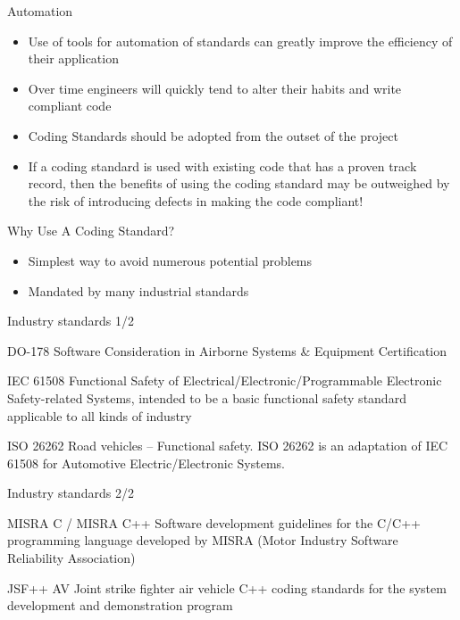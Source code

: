 \documentclass{beamer}
\begin{document}
\begin{frame}{Automation}
\begin{itemize}
  \item Use of tools for automation of standards can greatly improve the
  efficiency of their application
  \item Over time engineers will quickly tend to alter their habits and write
  compliant code
  \item Coding Standards should be adopted from the outset of the project
  \item If a coding standard is used with existing code that has a proven track
  record, then the benefits of using the coding standard may be outweighed by
  the risk of introducing defects in making the code compliant!
\end{itemize}
\end{frame}

\begin{frame}{Why Use A Coding Standard?}
\begin{itemize}
  \item Simplest way to avoid numerous potential problems
  \item Mandated by many industrial standards
\end{itemize}
\end{frame}

\begin{frame}{Industry standards 1/2}
\begin{block}{DO-178}
Software Consideration in Airborne Systems \& Equipment Certification
\end{block}

\begin{block}{IEC 61508}
Functional Safety of Electrical/Electronic/Programmable Electronic
Safety-related Systems, intended to be a basic functional safety
standard applicable to all kinds of industry
\end{block}

\begin{block}{ISO 26262}
Road vehicles – Functional safety. ISO 26262 is an adaptation of IEC 61508 for
Automotive Electric/Electronic Systems.
\end{block}
\end{frame}

\begin{frame}{Industry standards 2/2}
\begin{block}{MISRA C / MISRA C++}
Software development guidelines for the C/C++ programming language developed by
MISRA (Motor Industry Software Reliability Association)
\end{block}

\begin{block}{JSF++ AV}
Joint strike fighter air vehicle C++ coding standards for the system
development and demonstration program
\end{block}
\end{frame}
\end{document}

